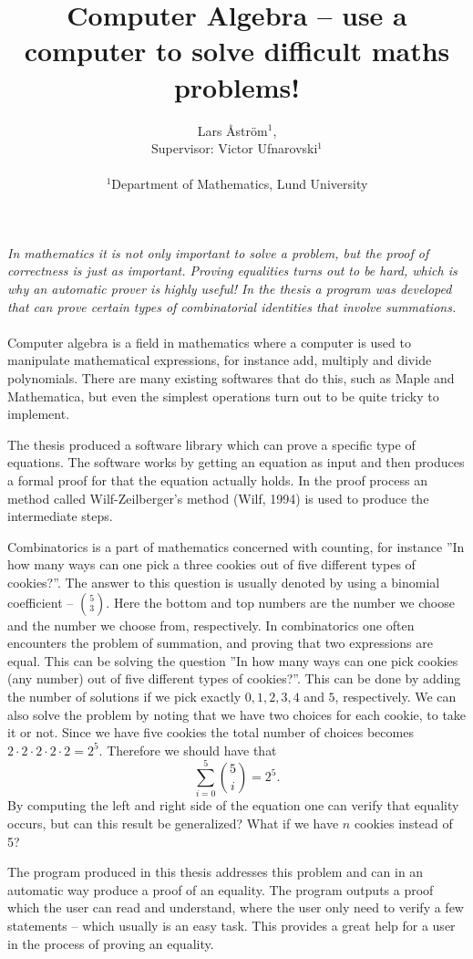 \documentclass[letterpaper]{article}
\title{Computer Algebra -- use a computer to solve difficult maths problems!}
\author{Lars Åström$^{1}$, \\ Supervisor: Victor Ufnarovski$^{1}$\\
\mbox{}\\
$^1$Department of Mathematics, Lund University
}
\begin{document}
\maketitle
\Large
\textit{
In mathematics it is not only important to solve a problem, but the proof of correctness is just as important. Proving equalities turns out to be hard, which is why an automatic prover is highly useful! In the thesis a program was developed that can prove certain types of combinatorial identities that involve summations.
}
\\ \\
\normalsize
Computer algebra is a field in mathematics where a computer is used to manipulate mathematical expressions, for instance add, multiply and divide polynomials. There are many existing softwares that do this, such as Maple and Mathematica, but even the simplest operations turn out to be quite tricky to implement.

The thesis produced a software library which can prove a specific type of equations. The software works by getting an equation as input and then produces a formal proof for that the equation actually holds. In the proof process an method called Wilf-Zeilberger's method (Wilf, 1994) is used to produce the intermediate steps.

Combinatorics is a part of mathematics concerned with counting, for instance ''In how many ways can one pick a three cookies out of five different types of cookies?''. The answer to this question is usually denoted by using a binomial coefficient -- $\binom{5}{3}$. Here the bottom and top numbers are the number we choose and the number we choose from, respectively. In combinatorics one often encounters the problem of summation, and proving that two expressions are equal. This can be solving the question ''In how many ways can one pick cookies (any number) out of five different types of cookies?''. This can be done by adding the number of solutions if we pick exactly $0,1,2,3,4$ and $5$, respectively. We can also solve the problem by noting that we have two choices for each cookie, to take it or not. Since we have five cookies the total number of choices becomes $2\cdot 2\cdot 2\cdot 2\cdot 2=2^5$. Therefore we should have that $$\sum_{i=0}^5 \binom{5}{i}=2^5.$$ By computing the left and right side of the equation one can verify that equality occurs, but can this result be generalized? What if we have $n$ cookies instead of 5?

The program produced in this thesis addresses this problem and can in an automatic way produce a proof of an equality. The program outputs a proof which the user can read and understand, where the user only need to verify a few statements -- which usually is an easy task. This provides a great help for a user in the process of proving an equality.
\end{document}
